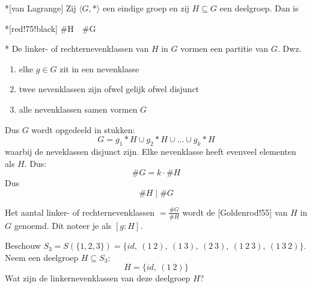 \begin{nicetheorem}*[van Lagrange]
    Zij $\langle G,* \rangle$ een eindige groep en zij $H \subseteq G$ een deelgroep. Dan is
    \begin{equationbox}*[red!75!black]
        \#H\ \mid\ \#G
    \end{equationbox}
    \nextpart[Bewijs.]*
    De linker- of rechternevenklassen van $H$ in $G$ vormen een partitie van $G$. Dwz.
    \begin{enumerate}
        \item elke $g \in G$ zit in een nevenklasse
        \item twee nevenklassen zijn ofwel gelijk ofwel disjunct
        \item alle nevenklassen samen vormen $G$
    \end{enumerate}
    Dus $G$ wordt opgedeeld in stukken:
    \begin{equation*}
        G = g_1*H \cup g_2*H \cup \ldots \cup g_k*H
    \end{equation*}
    waarbij de neveklassen disjunct zijn. Elke nevenklasse heeft evenveel elementen als $H$. Dus:
    \begin{equation*}
        \#G = k \cdot \#H
    \end{equation*}
    Dus 
    \begin{equation*}
        \#H \mid \#G
    \end{equation*}
\end{nicetheorem}

\textbf{} Het aantal linker- of rechternevenklassen $=\frac{\#G}{\#H}$ wordt de [Goldenrod!55] van $H$ in $G$ genoemd. Dit noteer je als $[g:H]$.

\textbf{} Beschouw $S_3 = S(\{1,2,3\}) = \{id,\ (1\ 2),\ (1\ 3),\ (2\ 3),\ (1\ 2\ 3),\ (1\ 3\ 2)\}$. Neem een deelgroep $H \subseteq S_3$:
\begin{equation*}
    H = \{id,\ (1\ 2)\}
\end{equation*}
Wat zijn de linkernevenklassen van deze deelgroep $H$?

